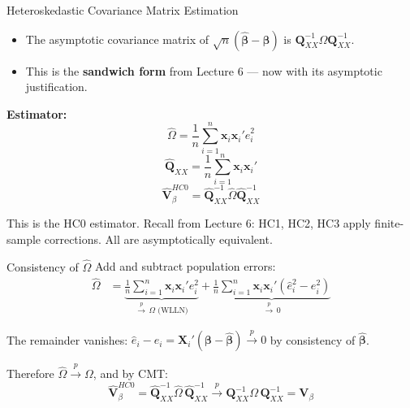 \documentclass[aspectratio=169, handout, t]{beamer}
\numberwithin{equation}{section}
\begin{document}

\begin{frame}{Heteroskedastic Covariance Matrix Estimation}
\begin{itemize}
\item The asymptotic covariance matrix of $\sqrt{n}(\hat{\bm{\beta}}-\bm{\beta})$ is $\bm{Q}_{XX}^{-1} \Omega \bm{Q}_{XX}^{-1}$.
\item This is the \textbf{sandwich form} from Lecture 6 --- now with its asymptotic justification.
\end{itemize}

\pause

\textbf{Estimator:}
$$\hat{\Omega}=\frac{1}{n}\sum_{i=1}^n \bm{x}_i\bm{x}_i'\hat{e}_i^2$$
$$\hat{\bm{Q}}_{XX}=\frac{1}{n}\sum_{i=1}^n\bm{x}_i\bm{x}_i'$$
$$\hat{\bm{V}}_\beta^{HC0}=\hat{\bm{Q}}_{XX}^{-1} \hat{\Omega} \hat{\bm{Q}}_{XX}^{-1}$$

\pause

This is the HC0 estimator. Recall from Lecture 6: HC1, HC2, HC3 apply finite-sample corrections. All are asymptotically equivalent.
\end{frame}


\begin{frame}{Consistency of $\hat{\Omega}$}
Add and subtract population errors:
\begin{align*}
\hat{\Omega}
&=\underbrace{\frac{1}{n}\sum_{i=1}^n \bm{x}_i\bm{x}_i'e_i^2}_{\overset{p}{\to}\,\Omega \text{ (WLLN)}}+\underbrace{\frac{1}{n}\sum_{i=1}^n \bm{x}_i\bm{x}_i'(\hat{e}_i^2-e_i^2)}_{\overset{p}{\to}\, 0}
\end{align*}

\pause

The remainder vanishes: $\hat{e}_i - e_i = \bm{X}_i'(\bm{\beta} - \hat{\bm{\beta}}) \overset{p}{\to} 0$ by consistency of $\hat{\bm{\beta}}$.

\pause

Therefore $\hat{\Omega}\overset{p}{\to}\Omega$, and by CMT:
$$\hat{\bm{V}}_\beta^{HC0}=\hat{\bm{Q}}_{XX}^{-1} \hat{\Omega}\, \hat{\bm{Q}}_{XX}^{-1} \overset{p}{\to} \bm{Q}_{XX}^{-1}\Omega\,\bm{Q}_{XX}^{-1} = \bm{V}_\beta$$

\end{frame}

\end{document}
